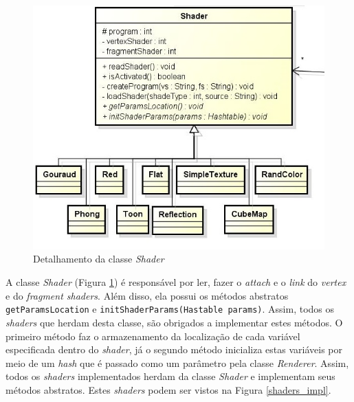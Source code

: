 	\begin{figure}[ht]
	\centering
		\includegraphics[keepaspectratio=true,scale=0.6]{figuras/shaders_diag.jpg}
	\caption{Detalhamento da classe \textit{Shader}}
	\label{shaders_diag}
	\end{figure}

	A classe \textit{Shader} (Figura \ref{shaders_diag}) é responsável por ler, fazer o \textit{attach} e o \textit{link} do \textit{ vertex} e do \textit{fragment shaders}. Além disso, ela possui os métodos abstratos \texttt{getParamsLocation} e \texttt{initShaderParams(Hastable params)}. Assim, todos os \textit{shaders} que herdam desta classe, são obrigados a implementar estes métodos. O primeiro método faz o armazenamento da localização de cada variável especificada dentro do \textit{shader}, já o segundo método inicializa estas variáveis por meio de um \textit{hash} que é passado como um parâmetro pela classe \textit{Renderer}. Assim, todos os \textit{shaders} implementados herdam da classe \textit{Shader} e implementam seus métodos abstratos. Estes \textit{shaders} podem ser vistos na Figura \ref{shaders_impl}.  

